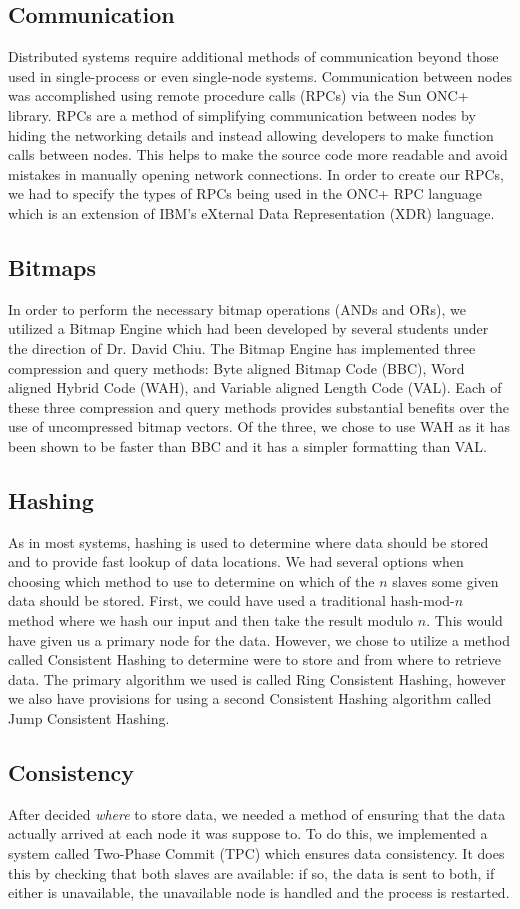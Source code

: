 \subsection{Communication}
Distributed systems require additional methods of communication beyond those used in single-process or even single-node systems.
Communication between nodes was accomplished using remote procedure calls (RPCs) via the Sun ONC+ library.
RPCs are a method of simplifying communication between nodes by hiding the networking details and instead allowing developers to make function calls between nodes.
This helps to make the source code more readable and avoid mistakes in manually opening network connections.
In order to create our RPCs, we had to specify the types of RPCs being used in the ONC+ RPC language which is an extension of IBM's eXternal Data Representation (XDR) language.
\subsection{Bitmaps}
In order to perform the necessary bitmap operations (ANDs and ORs), we utilized a Bitmap Engine which had been developed by several students under the direction of Dr. David Chiu.
The Bitmap Engine has implemented three compression and query methods: Byte aligned Bitmap Code (BBC), Word aligned Hybrid Code (WAH), and Variable aligned Length Code (VAL).
Each of these three compression and query methods provides substantial benefits over the use of uncompressed bitmap vectors.
Of the three, we chose to use WAH as it has been shown to be faster than BBC and it has a simpler formatting than VAL.
\subsection{Hashing}
As in most systems, hashing is used to determine where data should be stored and to provide fast lookup of data locations.
We had several options when choosing which method to use to determine on which of the \(n\) slaves some given data should be stored.
First, we could have used a traditional hash-mod-\(n\) method where we hash our input and then take the result modulo \(n\).
This would have given us a primary node for the data.
However, we chose to utilize a method called Consistent Hashing to determine were to store and from where to retrieve data.
The primary algorithm we used is called Ring Consistent Hashing, however we also have provisions for using a second Consistent Hashing algorithm called Jump Consistent Hashing.
\subsection{Consistency}
After decided \emph{where} to store data, we needed a method of ensuring that the data actually arrived at each node it was suppose to.
To do this, we implemented a system called Two-Phase Commit (TPC) which ensures data consistency.
It does this by checking that both slaves are available: if so, the data is sent to both, if either is unavailable, the unavailable node is handled and the process is restarted.
